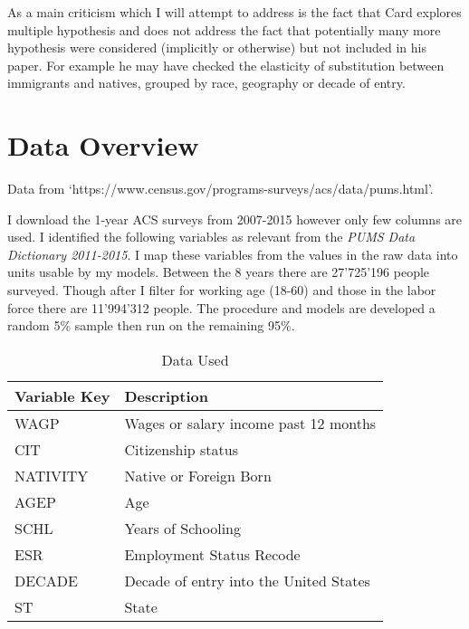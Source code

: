\documentclass[11pt]{article}
\theoremstyle{definition}
\theoremstyle{remark}
\begin{document}
As a main criticism which I will attempt to address is the fact that Card explores
multiple hypothesis and does not address the fact that potentially many more hypothesis
were considered (implicitly or otherwise) but not included in his paper. For example
he may have checked the elasticity of substitution between immigrants and natives,
grouped by race, geography or decade of entry.

\section{Data Overview}

Data from `https://www.census.gov/programs-surveys/acs/data/pums.html'.

I download the 1-year ACS surveys from 2007-2015 however only few columns
are used. I identified the following variables as relevant from the
\textit{PUMS Data Dictionary 2011-2015}. I map these variables from the
values in the raw data into units usable by my models.
Between the 8 years there are 27'725'196 people surveyed.
Though after I filter for working age (18-60) and those in the labor force
there are 11'994'312 people.
The procedure and models are developed a random 5\% sample then run
on the remaining 95\%.


\begin{table}[H]
    \caption{Data Used }
    \vspace{5mm}
    \label{}
    \centering
    \begin{tabular}{| l | l |}
        \hline
        Variable Key    & Description \\
        \hline \hline

        WAGP            & Wages or salary income past 12 months \\
        CIT             & Citizenship status \\
        NATIVITY        & Native or Foreign Born \\
        AGEP            & Age \\
        SCHL            & Years of Schooling \\
        ESR             & Employment Status Recode \\
        DECADE          & Decade of entry into the United States \\
        ST              & State \\
        \hline
    \end{tabular}
\end{table}
\end{document}
